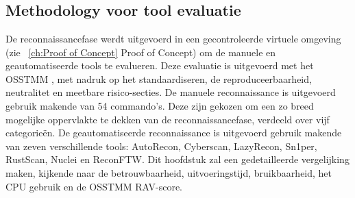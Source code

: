 
\chapter{}
\label{ch:geautomatiseerde Reconnaissance}

\section{Methodology voor tool evaluatie}

De reconnaissancefase werdt uitgevoerd in een gecontroleerde virtuele omgeving (zie ~\ref{ch:Proof of Concept} Proof of Concept) om de manuele en geautomatiseerde tools te evalueren.
Deze evaluatie is uitgevoerd met het OSSTMM , met nadruk op het standaardiseren, de reproduceerbaarheid, neutralitet en meetbare risico-secties.
De manuele reconnaissance is uitgevoerd gebruik makende van 54 commando's. 
Deze zijn gekozen om een zo breed mogelijke oppervlakte te dekken van de reconnaissancefase, verdeeld over vijf categorieën.
De geautomatiseerde reconnaissance is uitgevoerd gebruik makende van zeven verschillende tools: AutoRecon, Cyberscan, LazyRecon, Sn1per, RustScan, Nuclei en ReconFTW.
Dit hoofdstuk zal een gedetailleerde vergelijking maken, kijkende naar de betrouwbaarheid, uitvoeringstijd, bruikbaarheid, het CPU gebruik en de OSSTMM RAV-score.



